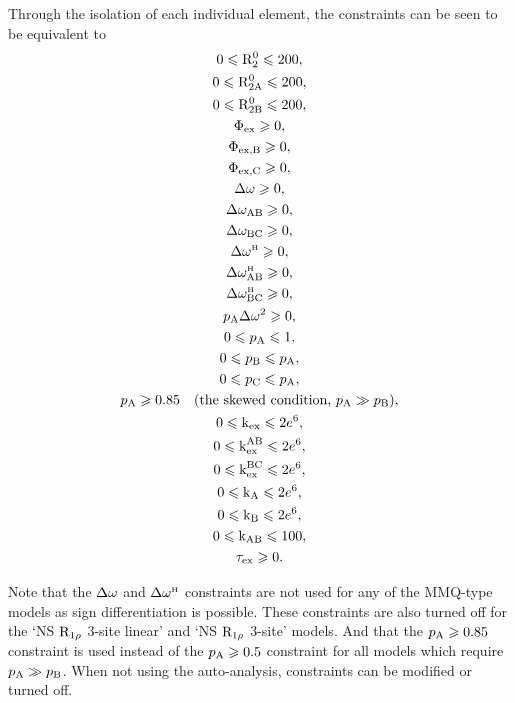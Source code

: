 \noindent  Through the isolation of each individual element, the constraints can be seen to be equivalent to
\begin{subequations}
\begin{gather} 
    0 \leqslant \mathrm{R}_2^0 \leqslant 200, \\
    0 \leqslant \mathrm{R}_{\mathrm{2A}}^0 \leqslant 200, \\
    0 \leqslant \mathrm{R}_{\mathrm{2B}}^0 \leqslant 200, \\
    \Phi_{\textrm{ex}} \geqslant 0, \\
    \Phi_{\textrm{ex,B}} \geqslant 0, \\
    \Phi_{\textrm{ex,C}} \geqslant 0, \\
    \Delta\omega \geqslant 0, \\
    \Delta\omega_{\textrm{AB}} \geqslant 0, \\
    \Delta\omega_{\textrm{BC}} \geqslant 0, \\
    \Delta\omega^{\scriptscriptstyle\mathrm{H}} \geqslant 0, \\
    \Delta\omega^{\scriptscriptstyle\mathrm{H}}_{\textrm{AB}} \geqslant 0, \\
    \Delta\omega^{\scriptscriptstyle\mathrm{H}}_{\textrm{BC}} \geqslant 0, \\
    p_{\textrm{A}}\Delta\omega^2 \geqslant 0, \\
    0 \leqslant p_{\textrm{A}} \leqslant 1, \\
    0 \leqslant p_{\textrm{B}} \leqslant p_{\textrm{A}}, \\
    0 \leqslant p_{\textrm{C}} \leqslant p_{\textrm{A}}, \\
    p_{\textrm{A}} \geqslant 0.85 \quad (\textrm{the skewed condition, } p_{\textrm{A}} \gg p_{\textrm{B}}), \\
    0 \leqslant \textrm{k}_{\textrm{ex}} \leqslant 2e^6, \\
    0 \leqslant \textrm{k}_{\textrm{ex}}^{\textrm{AB}} \leqslant 2e^6, \\
    0 \leqslant \textrm{k}_{\textrm{ex}}^{\textrm{BC}} \leqslant 2e^6, \\
    0 \leqslant \textrm{k}_{\textrm{A}} \leqslant 2e^6, \\
    0 \leqslant \textrm{k}_{\textrm{B}} \leqslant 2e^6, \\
    0 \leqslant \textrm{k}_{\textrm{AB}} \leqslant 100, \\
    \tau_{\textrm{ex}} \geqslant 0.
\end{gather} 
\end{subequations}

Note that the $\Delta\omega$ and $\Delta\omega^{\scriptscriptstyle\mathrm{H}}$ constraints are not used for any of the MMQ-type models as sign differentiation is possible.
These constraints are also turned off for the `NS $\mathrm{R}_{1\rho}$ 3-site linear' and `NS $\mathrm{R}_{1\rho}$ 3-site' models.
And that the $p_{\textrm{A}} \geqslant 0.85$ constraint is used instead of the $p_{\textrm{A}} \geqslant 0.5$ constraint for all models which require $p_{\textrm{A}} \gg p_{\textrm{B}}$.
When not using the auto-analysis, constraints can be modified or turned off.


